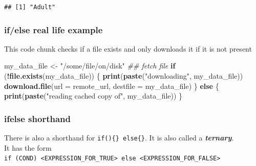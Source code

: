 \documentclass[]{book}
\newenvironment{Shaded}{\begin{snugshade}}{\end{snugshade}}
\newcommand{\CommentTok}[1]{\textcolor[rgb]{0.56,0.35,0.01}{\textit{#1}}}
\newcommand{\ControlFlowTok}[1]{\textcolor[rgb]{0.13,0.29,0.53}{\textbf{#1}}}
\newcommand{\DataTypeTok}[1]{\textcolor[rgb]{0.13,0.29,0.53}{#1}}
\newcommand{\DecValTok}[1]{\textcolor[rgb]{0.00,0.00,0.81}{#1}}
\newcommand{\KeywordTok}[1]{\textcolor[rgb]{0.13,0.29,0.53}{\textbf{#1}}}
\newcommand{\NormalTok}[1]{#1}
\newcommand{\OperatorTok}[1]{\textcolor[rgb]{0.81,0.36,0.00}{\textbf{#1}}}
\newcommand{\StringTok}[1]{\textcolor[rgb]{0.31,0.60,0.02}{#1}}
\begin{document}
\begin{verbatim}
## [1] "Adult"
\end{verbatim}

\hypertarget{ifelse-real-life-example}{%
\subsubsection*{if/else real life example}\label{ifelse-real-life-example}}

This code chunk checks if a file exists and only downloads it if it is not present

\begin{Shaded}
\begin{Highlighting}[]
\NormalTok{my_data_file <-}\StringTok{ "/some/file/on/disk"}
\CommentTok{## fetch file}
\ControlFlowTok{if}\NormalTok{ (}\OperatorTok{!}\KeywordTok{file.exists}\NormalTok{(my_data_file)) \{}
    \KeywordTok{print}\NormalTok{(}\KeywordTok{paste}\NormalTok{(}\StringTok{"downloading"}\NormalTok{, my_data_file))}
    \KeywordTok{download.file}\NormalTok{(}\DataTypeTok{url =}\NormalTok{ remote_url, }\DataTypeTok{destfile =}\NormalTok{ my_data_file)}
\NormalTok{\} }\ControlFlowTok{else}\NormalTok{ \{}
    \KeywordTok{print}\NormalTok{(}\KeywordTok{paste}\NormalTok{(}\StringTok{"reading cached copy of"}\NormalTok{, my_data_file))}
\NormalTok{\}}
\end{Highlighting}
\end{Shaded}

\hypertarget{ifelse-shorthand}{%
\subsubsection*{ifelse shorthand}\label{ifelse-shorthand}}

There is also a shorthand for \texttt{if()\{\}\ else\{\}}. It is also called a \textbf{\emph{ternary}}.\\
It has the form\\
\texttt{if\ (COND)\ \textless{}EXPRESSION\_FOR\_TRUE\textgreater{}\ else\ \textless{}EXPRESSION\_FOR\_FALSE\textgreater{}}

\begin{Shaded}
\end{Shaded}
\end{document}
